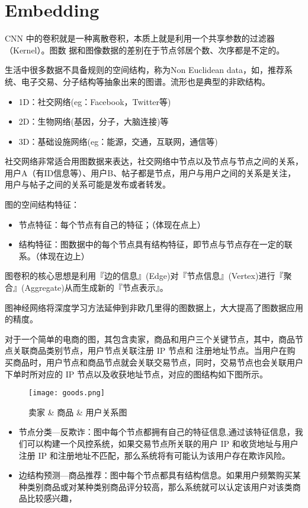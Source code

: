 \section{Embedding}

CNN 中的卷积就是一种离散卷积，本质上就是利用一个共享参数的过滤器（Kernel）。图数
据和图像数据的差别在于节点邻居个数、次序都是不定的。

生活中很多数据不具备规则的空间结构，称为Non Euclidean data，如，推荐系统、电子交易、分子结构等抽象出来的图谱。流形也是典型的非欧结构。
\begin{itemize}
    \item 1D：社交网络(eg：Facebook，Twitter等)
    \item 2D：生物网络(基因，分子，大脑连接)等
    \item 3D：基础设施网络(eg：能源，交通，互联网，通信等)
\end{itemize}

社交网络非常适合用图数据来表达，社交网络中节点以及节点与节点之间的关系，用户A（有ID信息等）、用户B、帖子都是节点，用户与用户之间的关系是关注，用户与帖子之间的关系可能是发布或者转发。

图的空间结构特征：
\begin{itemize}
    \item  节点特征：每个节点有自己的特征；（体现在点上）
    \item  结构特征：图数据中的每个节点具有结构特征，即节点与节点存在一定的联系。（体现在边上）
\end{itemize}

图卷积的核心思想是利用『边的信息』(Edge)对『节点信息』(Vertex)进行『聚合』(Aggregate)从而生成新的『节点表示』。

图神经网络将深度学习方法延伸到非欧几里得的图数据上，大大提高了图数据应用的精度。

\begin{myExample}
    对于一个简单的电商的图，其包含卖家，商品和用户三个关键节点，其中，商品节点关联商品类别节点，用户节点关联注册 IP 节点和 注册地址节点。当用户在购买商品时，用户节点和商品节点就会关联交易节点，同时，交易节点也会关联用户下单时所对应的 IP 节点以及收获地址节点，对应的图结构如下图所示。
    \begin{figure}[htb!]
        \centering
        \texttt{[image: goods.png]}
        \caption{卖家 \& 商品 \& 用户关系图 }
    \end{figure}
    \begin{itemize}
        \item  节点分类—反欺诈：图中每个节点都拥有自己的特征信息,通过该特征信息，我们可以构建一个风控系统，如果交易节点所关联的用户 IP 和收货地址与用户注册 IP 和注册地址不匹配，那么系统将有可能认为该用户存在欺诈风险。
        \item  边结构预测—商品推荐：图中每个节点都具有结构信息。如果用户频繁购买某种类别商品或对某种类别商品评分较高，那么系统就可以认定该用户对该类商品比较感兴趣，
    \end{itemize}
\end{myExample}

